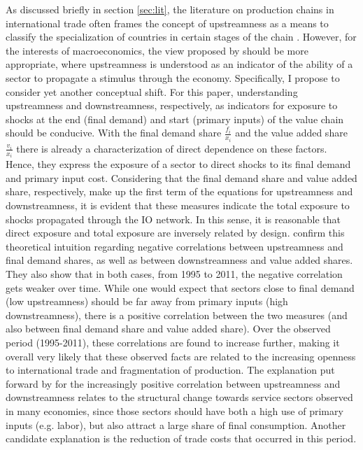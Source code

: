 As discussed briefly in section \ref{sec:lit}, the literature on production chains in international trade often frames the concept of 
upstreamness as a means to classify the specialization of countries in certain stages of the chain 
\parencite{antras2012MeasuringUpstreamnessProduction}. However, for the interests of macroeconomics, the view proposed by 
\textcite{miller2017OutputUpstreamnessInput} should be more appropriate, where upstreamness is understood as an indicator of the 
ability of a sector to propagate a stimulus through the economy. Specifically, I propose to consider yet another conceptual shift. For 
this paper, understanding upstreamness and downstreamness, respectively, as indicators for exposure to shocks at the end (final demand) 
and start (primary inputs) of the value chain should be conducive. With the final demand share $\frac{f_i}{x_i}$ and the value added 
share $\frac{v_i}{x_i}$ there is already a characterization of direct dependence on these factors. Hence, they express the exposure of 
a sector to direct shocks to its final demand and primary input cost. Considering that the final demand share and value added share, 
respectively, make up the first term of the equations for upstreamness and downstreamness, it is evident that these measures indicate 
the total exposure to shocks propagated through the IO network. In this sense, it is reasonable that direct exposure and total exposure 
are inversely related by design. \textcite{antras2018MeasurementUpstreamnessDownstreamness} confirm this theoretical intuition regarding 
negative correlations between upstreamness and final demand shares, as well as between downstreamness and value added shares. They also 
show that in both cases, from 1995 to 2011, the negative correlation gets weaker over time. While one would expect that sectors close to 
final demand (low upstreamness) should be far away from primary inputs (high downstreamness), there is a positive correlation between the 
two measures (and also between final demand share and value added share). Over the observed period (1995-2011), these correlations are 
found to increase further, making it overall very likely that these observed facts are related to the increasing openness to international 
trade and fragmentation of production. The explanation put forward by \textcite{antras2018MeasurementUpstreamnessDownstreamness} for the 
increasingly positive correlation between upstreamness and downstreamness relates to the structural change towards service sectors 
observed in many economies, since those sectors should have both a high use of primary inputs (e.g. labor), but also attract a large 
share of final consumption. Another candidate explanation is the reduction of trade costs that occurred in this period.

